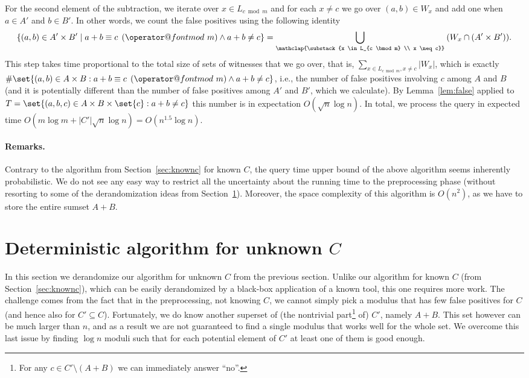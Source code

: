 \documentclass{theoretics}
\makeatletter
\newcommand{\tpmod}[1]{\mkern 8mu({\operator@font mod}\mkern 6mu#1)}
\makeatother
\begin{document}
For the second element of the subtraction, we iterate over $x \in L    _{c \bmod m}$ and for each $x \neq c$ we go over $(a,b) \in W_x$ and add one when $a \in A'$ and $b \in B'$. In other words, we count the false positives using the following identity
\[
\{(a,b) \in A' \times B' \mid a + b \equiv c \tpmod{m} \land a + b \neq c\}
= \bigcup_{\mathclap{\substack{x \in L_{c \bmod m} \\ x \neq c}}} \: (W_x \cap (A' \times B')).
\]
This step takes time proportional to the total size of sets of witnesses that we go over, that is, $\sum_{x \in L_{c \bmod m}, x \neq c} |W_x|$, which is exactly
$\#\set{(a, b) \in A \times B : a+b \equiv c \tpmod{m} \land a+b\neq c}$, i.e., the number of false positives involving $c$ among $A$ and $B$ (and it is potentially different than the number of false positives among $A'$ and $B'$, which we calculate). By Lemma~\ref{lem:false} applied to $T = \set{(a,b,c) \in A \times B \times \set{c} : a + b \neq c}$ this number is in expectation $O(\sqrt{n} \log n)$. In total, we process the query in expected time $O(m \log m + |C'|\sqrt{n}\log n) = O(n^{1.5}\log n)$.

\paragraph{Remarks.}
Contrary to the algorithm from Section~\ref{sec:knownc} for known $C$, the query time upper bound of the above algorithm seems inherently probabilistic. We do not see any easy way to restrict all the uncertainty about the running time to the preprocessing phase (without resorting to some of the derandomization ideas from Section~\ref{sec:unknowncdet}). Moreover, the space complexity of this algorithm is $O(n^2)$, as we have to store the entire sumset $A+B$.

\section{Deterministic algorithm for unknown \texorpdfstring{$C$}{C}}
\label{sec:unknowncdet}

In this section we derandomize our algorithm for unknown $C$ from the previous section. Unlike our algorithm for known $C$ (from Section~\ref{sec:knownc}), which can be easily derandomized by a black-box application of a known tool, this one requires more work. The challenge comes from the fact that in the preprocessing, not knowing $C$, we cannot simply pick a modulus that has few false positives for $C$ (and hence also for $C' \subseteq C$). Fortunately, we do know another superset of (the nontrivial part\footnote{For any $c\in C'\setminus (A+B)$ we can immediately answer ``no''.} of) $C'$, namely $A+B$. This set however can be much larger than $n$, and as a result we are not guaranteed to find a single modulus that works well for the whole set. We overcome this last issue by finding $\log n$ moduli such that for each potential element of $C'$ at least one of them is good enough.
\end{document}
